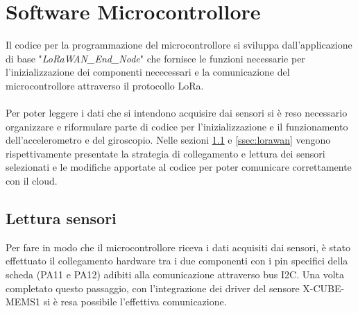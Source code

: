 \section{Software Microcontrollore}
Il codice per la programmazione del microcontrollore si sviluppa dall'applicazione di base "\textit{LoRaWAN\_End\_Node}" che fornisce
le funzioni necessarie per l'inizializzazione dei componenti nececessari e la comunicazione del microcontrollore attraverso il protocollo LoRa.
\\\\Per poter leggere i dati che si intendono acquisire dai sensori si è reso necessario organizzare e riformulare parte di codice per l'inizializzazione e il funzionamento dell'accelerometro
e del giroscopio. Nelle sezioni \ref{ssec:sensori} e \ref{ssec:lorawan} vengono rispettivamente presentate la strategia di collegamento e lettura dei sensori selezionati e 
le modifiche apportate al codice per poter comunicare correttamente con il cloud.

\subsection{Lettura sensori}\label{ssec:sensori}
Per fare in modo che il microcontrollore riceva i dati acquisiti dai sensori, è stato effettuato il collegamento hardware tra i due componenti con i pin specifici della scheda (PA11 e PA12) 
adibiti alla comunicazione attraverso bus I2C. Una volta completato questo passaggio, con l'integrazione dei driver del sensore X-CUBE-MEMS1 si è resa possibile l'effettiva comunicazione.

